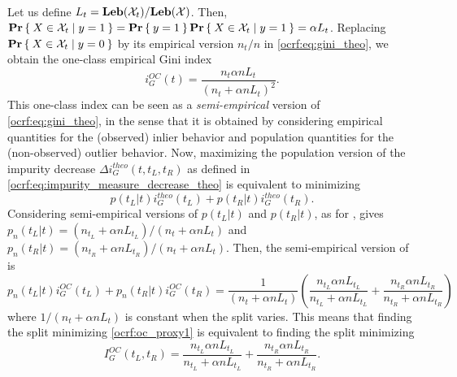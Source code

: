 \paragraph{}
Let us define $L_t=\mathbf{Leb}(\mathcal{X}_t)/\mathbf{Leb}(\mathcal{X})$. Then,
${\mathbf{{Pr}}}\Set{X \in \mathcal{X}_t | y = 1}= {\mathbf{{Pr}}}\Set{y = 1}
{\mathbf{{Pr}}}\Set{X \in \mathcal{X}_t | y = 1} = \alpha L_t $. Replacing
${\mathbf{{Pr}}}\Set{X \in \mathcal{X}_t | y=0}$ by its empirical version $n_t /
n$ in \cref{ocrf:eq:gini_theo}, we obtain the one-class empirical Gini index
\begin{dmath}
    \label{ocrf:eq:gini_oc}
    i_G^{OC}(t) = \frac{n_t \alpha n L_t}{(n_t + \alpha n L_t)^2}.
\end{dmath}
This one-class index can be seen as a \emph{semi-empirical} version of
\cref{ocrf:eq:gini_theo}, in the sense that it is obtained by considering
empirical quantities for the (observed) inlier behavior and population
quantities for the (non-observed) outlier behavior.
%
Now, maximizing the population version of the impurity decrease $\Delta
i_G^{theo}(t, t_L, t_R)$ as defined in
\cref{ocrf:eq:impurity_measure_decrease_theo} is equivalent to minimizing
\begin{dmath}
    \label{ocrf:theo_proxy}
    p(t_L | t) i_G^{theo}(t_L) +  p(t_R | t) i_G^{theo}(t_R).
\end{dmath}
Considering semi-empirical versions of $p(t_L | t)$ and $p(t_R | t)$, as for
, gives $p_n(t_L | t) = (n_{t_L} + \alpha n L_{t_L}) /
(n_{t} + \alpha n L_{t})$ and $p_n(t_R | t) = (n_{t_R} + \alpha n L_{t_R}) /
(n_{t} + \alpha n L_{t})$. Then, the semi-empirical version of
 is
\begin{dmath}
    \label{ocrf:oc_proxy1}
    p_n(t_L | t) i_G^{OC}(t_L) +  p_n(t_R | t) i_G^{OC}(t_R)
    = \frac{1}{(n_{t} + \alpha n L_{t})} \left(\frac{n_{t_L}\alpha n
    L_{t_L}}{n_{t_L} + \alpha n L_{t_L}} + \frac{n_{t_R}\alpha n
    L_{t_R}}{n_{t_R} + \alpha n L_{t_R}}\right)
\end{dmath}
where $ 1/(n_{t} + \alpha n L_{t})$ is constant when the split varies.  This
means that finding the split minimizing \cref{ocrf:oc_proxy1} is equivalent to
finding the split minimizing
\begin{dmath}
    \label{ocrf:oc_proxy2}
    I_G^{OC}(t_L, t_R) = \frac{n_{t_L}\alpha n L_{t_L}}{n_{t_L} + \alpha n
    L_{t_L}} + \frac{n_{t_R}\alpha n L_{t_R}}{n_{t_R} + \alpha n L_{t_R}}.
\end{dmath}

